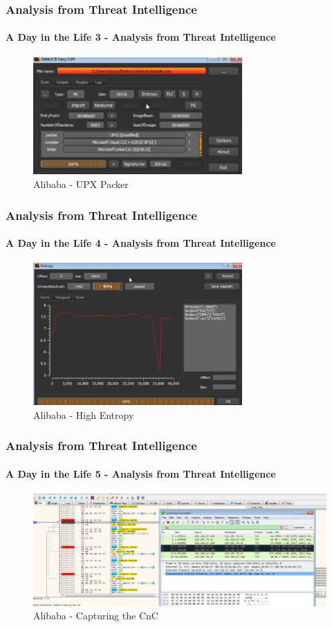 \documentclass[aspectratio=169]{beamer}
\begin{document}
\begin{frame}
  \frametitle{Analysis from Threat Intelligence}
  \framesubtitle{A Day in the Life 3 - Analysis from Threat Intelligence}
  \begin{center}
    \begin{figure}
    \includegraphics[width=8cm,keepaspectratio]{alibaba_die_main}
    \caption{Alibaba - UPX Packer}
    \end{figure}
  \end{center}
\end{frame}

\begin{frame}
  \frametitle{Analysis from Threat Intelligence}
  \framesubtitle{A Day in the Life 4 - Analysis from Threat Intelligence}
  \begin{center}
    \begin{figure}
      \includegraphics[width=8cm,keepaspectratio]{alibaba_die_entropy}
      \caption{Alibaba - High Entropy}
    \end{figure}
  \end{center}
\end{frame}

\begin{frame}
  \frametitle{Analysis from Threat Intelligence}
  \framesubtitle{A Day in the Life 5 - Analysis from Threat Intelligence}
  \begin{center}
    \begin{figure}
      \includegraphics[width=14cm,keepaspectratio]{alibaba_cnc}
      \caption{Alibaba - Capturing the CnC}
    \end{figure}
  \end{center}
\end{frame}
\end{document}
